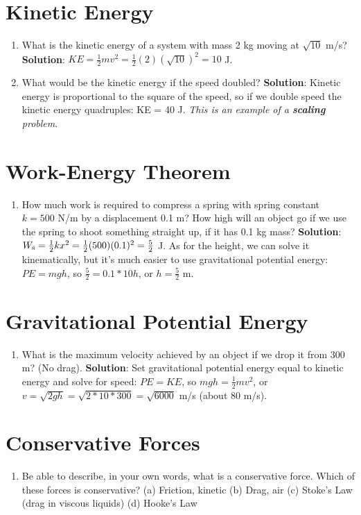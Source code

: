 \documentclass[10pt]{article}
\begin{document}
\section{Kinetic Energy}
\begin{enumerate}
\item What is the kinetic energy of a system with mass 2 kg moving at $\sqrt{10}$ m/s? \textbf{Solution}: $KE = \frac{1}{2}mv^2 = \frac{1}{2}(2)(\sqrt{10})^2 = 10$ J.
\item What would be the kinetic energy if the speed doubled?  \textbf{Solution}: Kinetic energy is proportional to the square of the speed, so if we double speed the kinetic energy quadruples: KE = 40 J. \textit{This is an example of a \textbf{scaling} problem}.
\end{enumerate}
\section{Work-Energy Theorem}
\begin{enumerate}
\item How much work is required to compress a spring with spring constant $k = 500$ N/m by a displacement 0.1 m?  How high will an object go if we use the spring to shoot something straight up, if it has 0.1 kg mass?  \textbf{Solution}: $W_{\rm s} = \frac{1}{2}kx^2 = \frac{1}{2}(500)(0.1)^2 = \frac{5}{2}$ J.  As for the height, we can solve it kinematically, but it's much easier to use gravitational potential energy: $PE = mgh$, so $\frac{5}{2} = 0.1 * 10 h$, or $h = \frac{5}{2}$ m.
\end{enumerate}
\section{Gravitational Potential Energy}
\begin{enumerate}
\item What is the maximum velocity achieved by an object if we drop it from 300 m?  (No drag).  \textbf{Solution}: Set gravitational potential energy equal to kinetic energy and solve for speed: $PE = KE$, so $mgh = \frac{1}{2} m v^2$, or $v = \sqrt{2gh} = \sqrt{2*10*300} = \sqrt{6000}$ m/s (about 80 m/s).
\end{enumerate}
\section{Conservative Forces}
\begin{enumerate}
\item Be able to describe, in your own words, what is a conservative force.  Which of these forces is conservative?  (a) Friction, kinetic (b) Drag, air (c) Stoke's Law (drag in viscous liquids) (d) Hooke's Law
\end{enumerate}
\end{document}
